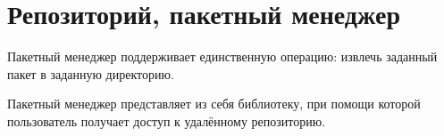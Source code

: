 \section{Репозиторий, пакетный менеджер}
\label{bunsanpm}
Пакетный менеджер поддерживает единственную операцию:
извлечь заданный пакет в заданную директорию.

Пакетный менеджер представляет из себя библиотеку,
при помощи которой пользователь получает доступ
к удалённому репозиторию.
